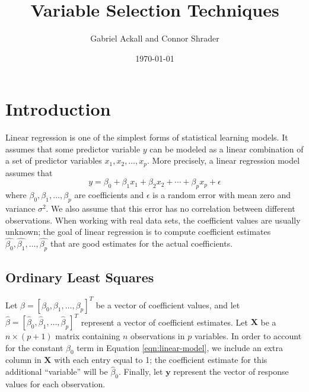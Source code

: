 \documentclass{article}
\title{Variable Selection Techniques}
\author{Gabriel Ackall and Connor Shrader}
\date{\today}
\begin{document}
\maketitle
\tableofcontents

\section{Introduction}
Linear regression is one of the simplest forms of statistical learning models. It assumes that some predictor variable $y$ can be modeled as a linear combination of a set of predictor variables $x_1, x_2, \dotsc, x_p$. More precisely, a linear regression model assumes that
\begin{equation}\label{eqn:linear-model}
	y = \beta_0 + \beta_1 x_1 + \beta_2 x_2 + \cdots + \beta_p x_p + \epsilon
\end{equation}
where $\beta_0, \beta_1, \dotsc, \beta_p$ are coefficients and $\epsilon$ is a random error with mean zero and variance $\sigma^2$. We also assume that this error has no correlation between different observations. When working with real data sets, the coefficient values are usually unknown; the goal of linear regression is to compute coefficient estimates $\hat{\beta_0}, \hat{\beta_1}, \dotsc, \hat{\beta_p}$ that are good estimates for the actual coefficients.

\subsection{Ordinary Least Squares}

Let $\beta = [\beta_0, \beta_1, \dotsc, \beta_p]^{T}$ be a vector of coefficient values, and let $\hat{\beta} = [\hat{\beta}_0, \hat{\beta}_1, \dotsc, \hat{\beta}_p]^{T}$ represent a vector of coefficient estimates. Let $\mathbf{X}$ be a $n\times(p + 1)$ matrix containing $n$ observations in $p$ variables. In order to account for the constant $\beta_0$ term in Equation \ref{eqn:linear-model}, we include an extra column in $\mathbf{X}$ with each entry equal to 1; the coefficient estimate for this additional ``variable'' will be $\hat{\beta}_0$. Finally, let $\mathbf{y}$ represent the vector of response values for each observation.
\end{document}
